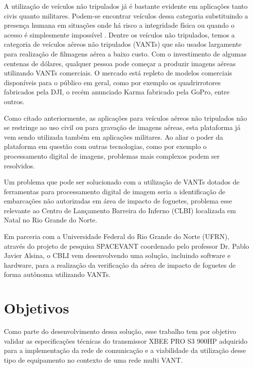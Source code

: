 \label{Cap:introducao}

A utilização de veículos não tripulados já é bastante evidente em aplicações tanto civis quanto militares. Podem-se encontrar veículos dessa categoria substituindo a presença humana em situações onde há risco a integridade física ou quando o acesso é simplesmente impossível \cite{UAVSurveypt1}. Dentre os veículos não tripulados, temos a categoria de veículos aéreos não tripulados (VANTs) que são usados largamente para realização de filmagens aérea a baixo custo. Com o investimento de algumas centenas de dólares, qualquer pessoa pode começar a produzir imagens aéreas utilizando VANTs comerciais. O mercado está repleto de modelos comerciais disponíveis para o público em geral, como por exemplo os quadrirrotores fabricados pela DJI, o recém anunciado Karma fabricado pela GoPro, entre outros.

Como citado anteriormente, as aplicações para veículos aéreos não tripulados não se restringe ao uso civil ou para gravação de imagens aéreas, esta plataforma já vem sendo utilizada também em aplicações militares. Ao aliar o poder da plataforma em questão com outras tecnologias, como por exemplo o processamento digital de imagens, problemas mais complexos podem ser resolvidos. 

Um problema que pode ser solucionado com a utilização de VANTs dotados de ferramentas para processamento digital de imagem seria a identificação de embarcações não autorizadas em área de impacto de foguetes, problema esse relevante ao Centro de Lançamento Barreira do Inferno (CLBI) localizada em Natal no Rio Grande do Norte. 

Em parceria com a Universidade Federal do Rio Grande do Norte (UFRN), através do projeto de pesquisa SPACEVANT coordenado pelo professor Dr. Pablo Javier Alsina, o CBLI vem desenvolvendo uma solução, incluindo software e hardware, para a realização da verificação da aérea de impacto de foguetes de forma autônoma utilizando VANTs. 

\section{Objetivos}

Como parte do desenvolvimento dessa solução, esse trabalho tem por objetivo validar as especificações técnicas do transmissor XBEE PRO S3 900HP adquirido para a implementação da rede de comunicação e a viabilidade da utilização desse tipo de equipamento no contexto de uma rede multi VANT.

